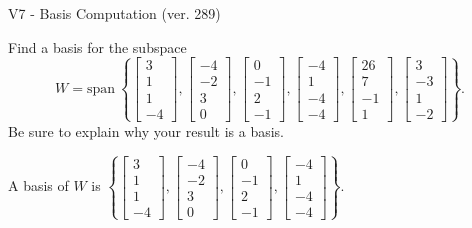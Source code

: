 \begin{exercise}
  \begin{exerciseTitle}V7 - Basis Computation (ver. 289)\end{exerciseTitle}
  \begin{exerciseStatement}
    Find a basis for the subspace 
\[W=\mathrm{span}\ \left\{\left[\begin{array}{r}
3 \\
1 \\
1 \\
-4
\end{array}\right] , \left[\begin{array}{r}
-4 \\
-2 \\
3 \\
0
\end{array}\right] , \left[\begin{array}{r}
0 \\
-1 \\
2 \\
-1
\end{array}\right] , \left[\begin{array}{r}
-4 \\
1 \\
-4 \\
-4
\end{array}\right] , \left[\begin{array}{r}
26 \\
7 \\
-1 \\
1
\end{array}\right] , \left[\begin{array}{r}
3 \\
-3 \\
1 \\
-2
\end{array}\right]\right\}.\]
 Be sure to explain why your result is a basis.


  \end{exerciseStatement}
  \begin{exerciseAnswer}
   A basis of \(W\) is  \(\left\{\left[\begin{array}{r}
3 \\
1 \\
1 \\
-4
\end{array}\right] , \left[\begin{array}{r}
-4 \\
-2 \\
3 \\
0
\end{array}\right] , \left[\begin{array}{r}
0 \\
-1 \\
2 \\
-1
\end{array}\right] , \left[\begin{array}{r}
-4 \\
1 \\
-4 \\
-4
\end{array}\right]\right\}\).
  


  \end{exerciseAnswer}
\end{exercise}